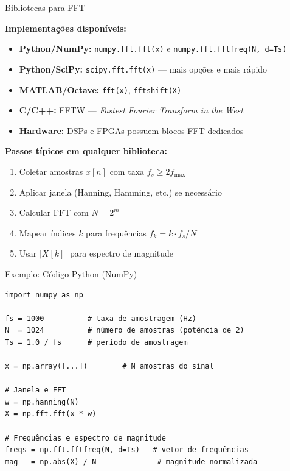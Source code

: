 
\begin{frame}{Bibliotecas para FFT}

\textbf{Implementações disponíveis:}

\begin{itemize}
\item \textbf{Python/NumPy:} \texttt{numpy.fft.fft(x)} e \texttt{numpy.fft.fftfreq(N, d=Ts)}
\item \textbf{Python/SciPy:} \texttt{scipy.fft.fft(x)} --- mais opções e mais rápido
\item \textbf{MATLAB/Octave:} \texttt{fft(x)}, \texttt{fftshift(X)}
\item \textbf{C/C++:} FFTW --- \textit{Fastest Fourier Transform in the West}
\item \textbf{Hardware:} DSPs e FPGAs possuem blocos FFT dedicados
\end{itemize}

\vspace{0.4cm}

\textbf{Passos típicos em qualquer biblioteca:}

\begin{enumerate}
\item Coletar amostras $x[n]$ com taxa $f_s \geq 2f_{\max}$
\item Aplicar janela (Hanning, Hamming, etc.) se necessário
\item Calcular FFT com $N = 2^m$
\item Mapear índices $k$ para frequências $f_k = k\cdot f_s/N$
\item Usar $|X[k]|$ para espectro de magnitude
\end{enumerate}

\end{frame}


\begin{frame}[fragile]{Exemplo: Código Python (NumPy)}

\begin{verbatim}
import numpy as np

fs = 1000          # taxa de amostragem (Hz)
N  = 1024          # número de amostras (potência de 2)
Ts = 1.0 / fs      # período de amostragem

x = np.array([...])        # N amostras do sinal

# Janela e FFT
w = np.hanning(N)
X = np.fft.fft(x * w)

# Frequências e espectro de magnitude
freqs = np.fft.fftfreq(N, d=Ts)   # vetor de frequências
mag   = np.abs(X) / N              # magnitude normalizada
\end{verbatim}

\end{frame}

